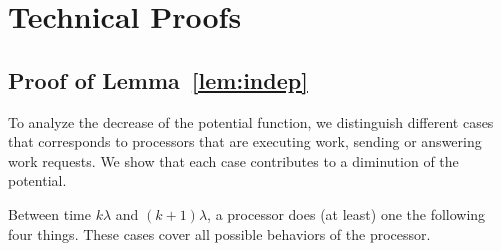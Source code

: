\section{Technical Proofs}
\label{sec:proofs}

\subsection{Proof of Lemma~\ref{lem:indep}}
\label{proof:lem:indep}

  To analyze the decrease of the potential function, we distinguish
  different cases that corresponds to processors that are executing
  work, sending or answering work requests.  We show that each case
  contributes to a diminution of the potential.

  Between time $k\lambda$ and $(k+1)\lambda$, a processor does (at
  least) one the following four things.  These cases cover all
  possible behaviors of the processor.
